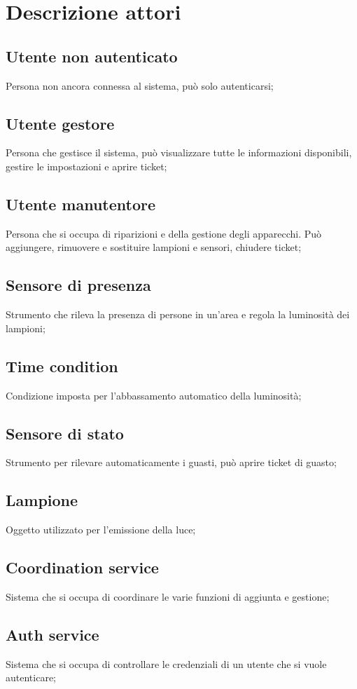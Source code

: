 \chapter{Descrizione attori}
    \section{Utente non autenticato} 
    Persona non ancora connessa al sistema, può solo autenticarsi;
    
    \section{Utente gestore} 
    Persona che gestisce il sistema, può visualizzare tutte le informazioni disponibili, gestire le impostazioni e aprire ticket;
    
    \section{Utente manutentore} 
    Persona che si occupa di riparizioni e della gestione degli apparecchi. Può aggiungere, rimuovere e sostituire lampioni e sensori, chiudere ticket;
    
    \section{Sensore di presenza} 
    Strumento che rileva la presenza di persone in un'area e regola la luminosità dei lampioni;
    
    \section{Time condition}
    Condizione imposta per l'abbassamento automatico della luminosità;
    
    \section{Sensore di stato} 
    Strumento per rilevare automaticamente i guasti, può aprire ticket di guasto;
    
    \section{Lampione} 
    Oggetto utilizzato per l'emissione della luce;
    
    \section{Coordination service} 
    Sistema che si occupa di coordinare le varie funzioni di aggiunta e gestione;
    
    \section{Auth service} 
    Sistema che si occupa di controllare le credenziali di un utente che si vuole autenticare;